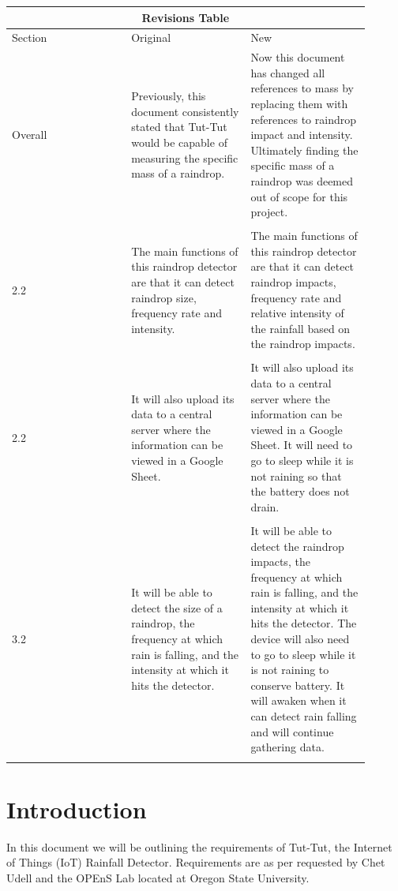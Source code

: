 \documentclass[letterpaper,10pt,draftclsnofoot,onecolumn]{article}
\begin{document}
\tableofcontents
\begin{center}
\begin{tabular}{ |p{0.3\linewidth}|p{0.3\linewidth}|p{0.3\linewidth}| }
\hline
\multicolumn{3}{|c|}{Revisions Table} \\
\hline
Section & Original & New \\
\hline
Overall &
Previously, this document consistently stated that Tut-Tut would be capable of measuring the specific mass of a raindrop. &
Now this document has changed all references to mass by replacing them with references to raindrop impact and intensity. Ultimately finding the specific mass of a raindrop was deemed out of scope for this project. \\
 && \\
2.2 &
The main functions of this raindrop detector are that it can detect raindrop size, frequency rate and intensity. &
The main functions of this raindrop detector are that it can detect raindrop impacts, frequency rate and relative intensity of the rainfall based on the raindrop impacts. \\
 && \\
2.2 &
It will also upload its data to a central server where the information can be viewed in a Google Sheet. &
It will also upload its data to a central server where the information can be viewed in a Google Sheet. It will need to go to sleep while it is not raining so that the battery does not drain. \\
 && \\
3.2 &
It will be able to detect the size of a raindrop, the frequency at which rain is falling, and the intensity at which it hits the detector. &
It will be able to detect the raindrop impacts, the frequency at which rain is falling, and the intensity at which it hits the detector. The device will also need to go to sleep while it is not raining to conserve battery. It will awaken when it can detect rain falling and will continue gathering data. \\
 && \\
\hline
\end{tabular}
\end{center}

\section{Introduction}
In this document we will be outlining the requirements of Tut-Tut, the Internet of Things (IoT) Rainfall Detector. Requirements are as per requested by Chet Udell and the OPEnS Lab located at Oregon State University.
\end{document}
